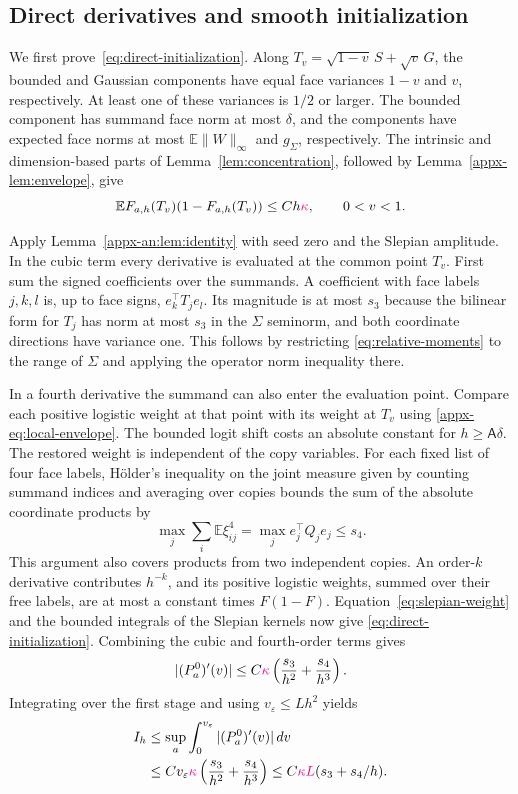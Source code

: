 \documentclass[11pt,letterpaper]{article}
\newcommand{\vSix}[1]{{\color{magenta}#1}}
\theoremstyle{remark}
\newcommand{\E}{\mathbb E}
\begin{document}
\subsection{Direct derivatives and smooth initialization}
\label{appx-an:sec:initialization}

We first prove~\eqref{eq:direct-initialization}. Along
\(T_v=\sqrt{1-v}\,S+\sqrt v\,G\), the bounded and Gaussian
components have equal face variances \(1-v\) and \(v\), respectively.
At least one of these variances is \(1/2\) or larger. The bounded
component has summand face
\vSix{norm at most \(\delta\), and the components have expected face
norms at most \(\E\|W\|_\infty\) and \(g_\Sigma\), respectively.
The intrinsic and dimension-based parts of Lemma~\ref{lem:concentration},
followed by Lemma~\ref{appx-lem:envelope}, give}
\begin{equation}
 \E F_{a,h}(T_v)(1-F_{a,h}(T_v))\le Ch\vSix{\kappa},
 \qquad 0<v<1.
 \label{eq:slepian-weight}
\end{equation}

Apply Lemma~\ref{appx-an:lem:identity} with seed zero and the Slepian amplitude. In the cubic term every derivative is evaluated at the common point $T_v$. {First sum the signed coefficients over the summands.} A coefficient with face labels $j,k,l$ is, up to face signs, $e_k^\top T_j e_l$. Its magnitude is at most $s_3$ because the bilinear form for $T_j$ has norm at most $s_3$ in the $\Sigma$ seminorm, and both coordinate directions have variance one. This follows by restricting \eqref{eq:relative-moments} to the range of $\Sigma$ and applying the operator norm inequality there.

{In a fourth derivative the summand can also enter the evaluation point.} Compare each positive logistic weight at that point with its weight at $T_v$ using \eqref{appx-eq:local-envelope}. The bounded logit shift costs an absolute constant for $h\ge\mathsf A\delta$. The restored weight is independent of the copy variables. For each fixed list of four face labels, H\"older's inequality on the joint measure given by {counting summand indices and averaging over copies} bounds the sum of the absolute coordinate products by
\[
 \max_j\sum_i\E\xi_{ij}^4=\max_j e_j^\top Q_j e_j\le s_4.
\]
This argument also covers products from two independent copies. An order-$k$ derivative contributes $h^{-k}$, and its positive logistic weights, summed over their free labels, are at most a constant times $F(1-F)$. Equation~\eqref{eq:slepian-weight} and the bounded integrals of the Slepian kernels now give \eqref{eq:direct-initialization}.
{
Combining the cubic and fourth-order terms gives
\[
 |(P_a^0)'(v)|
 \le C\vSix{\kappa}\left(\frac{s_3}{h^2}+\frac{s_4}{h^3}\right).
\]
Integrating over the first stage and using \(v_\varepsilon\le Lh^2\) yields
\[
\begin{aligned}
 I_h&\le\sup_a\int_0^{v_\varepsilon}|(P_a^0)'(v)|\,dv\\
 &\le C v_\varepsilon\vSix{\kappa}
       \left(\frac{s_3}{h^2}+\frac{s_4}{h^3}\right)
 \le C\vSix{\kappa L}(s_3+s_4/h).
\end{aligned}
\]
}
\end{document}
